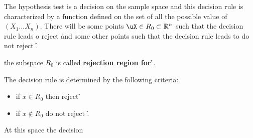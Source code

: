 The hypothesis test is a decision on the sample space and this decision rule is characterized by a function defined on the set of all the possible value of $(X_1 ...X_n)$. There will be some points $\uX \in R_0\subset \mathbb{R}^n$ such that the decision rule leads o reject \h and some other points such that the decision rule leads to do not reject \h.\\
\begin{defi}
	the subspace $R_0$ is called \textbf{rejection region for \h}.
\end{defi}
The decision rule is determined by the following criteria:\begin{itemize}
	\item if $x\in R_0$ then reject \h
	\item if $x\not \in R_0$ do not reject \h .
\end{itemize}
At this space the decision